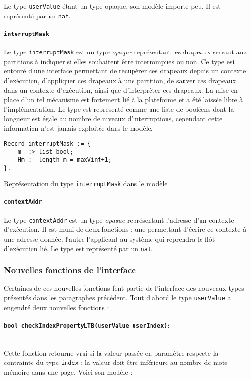 		Le type \texttt{userValue} étant un type opaque, son modèle importe peu. Il est représenté par un \texttt{nat}.

		\paragraph{\texttt{interruptMask}} Le type \texttt{interruptMask} est un type \emph{opaque} représentant les drapeaux servant aux partitions à indiquer si elles souhaitent être interrompues ou non. Ce type est entouré d'une interface permettant de récupérer ces drapeaux depuis un contexte d'exécution, d'appliquer ces drapeaux à une partition, de sauver ces drapeaux dans un contexte d'exécution, ainsi que d'interprêter ces drapeaux. La mise en place d'un tel mécanisme est fortement lié à la plateforme et a été laissée libre à l'implémentation. Le type est representé comme une liste de booléens dont la longueur est égale au nombre de niveaux d'interruptions, cependant cette information n'est jamais exploitée dans le modèle.
		\begin{listing}[!ht]
			\begin{verbatim}
Record interruptMask := {
    m  :> list bool;
    Hm :  length m = maxVint+1;
}.
			\end{verbatim}
			\caption{Représentation du type \texttt{interruptMask} dans le modèle}
		\end{listing}

		\paragraph{\texttt{contextAddr}} Le type \texttt{contextAddr} est un type \emph{opaque} représentant l'adresse d'un contexte d'exécution. Il est muni de deux fonctions : une permettant d'écrire ce contexte à une adresse donnée, l'autre l'applicant au système qui reprendra le flôt d'exécution lié. Le type est représenté par un \texttt{nat}.


		\subsubsection{Nouvelles fonctions de l'interface}

		Certaines de ces nouvelles fonctions font partie de l'interface des nouveaux types présentés dans les paragraphes précédent. Tout d'abord le type \texttt{userValue} a engendré deux nouvelles fonctions :
		\paragraph{\texttt{bool checkIndexPropertyLTB(userValue userIndex);}}~\\
		Cette fonction retourne vrai si la valeur passée en paramètre respecte la contrainte du type \texttt{index} ; la valeur doit être inférieure au nombre de mots mémoire dans une page. Voici son modèle :

